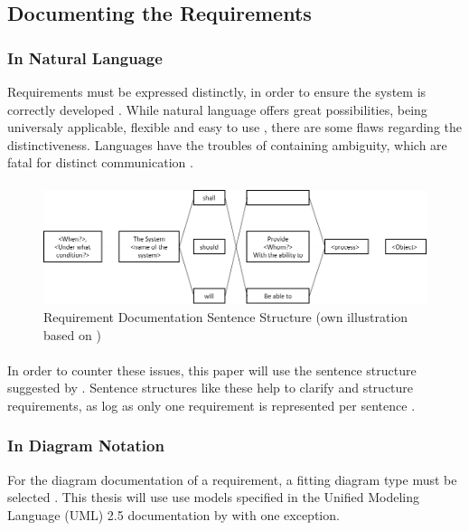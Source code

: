 \subsection{Documenting the Requirements}
\subsubsection{In Natural Language}
Requirements must be expressed distinctly, in order to ensure the system is correctly developed \parencites[107]{Ebert.2014}. While natural language offers great possibilities, being universaly applicable, flexible and easy to use \parencite[cf.][239]{Pohl.2007}, there are some flaws regarding the distinctiveness. Languages have the troubles of containing  ambiguity, which are fatal for distinct communication \parencite[cf.][239-243]{Pohl.2007}.

\paragraph{}
\begin{figure}[H]
    \centering
    \includegraphics[width=\textwidth]{img/SentenceStructure.png}
    \caption{Requirement Documentation Sentence Structure (own illustration based on \cite[246]{Pohl.2007})}
    \label{fig:sentencestructure}
\end{figure}

\paragraph{} In order to counter these issues, this paper will use the sentence structure suggested by \textcites[107]{Ebert.2014}[246]{Pohl.2007}. Sentence structures like these help to clarify and structure requirements, as log as only one requirement is represented per sentence \parencite[107]{Ebert.2014}. 


\subsubsection{In Diagram Notation}
For the diagram documentation of a requirement, a fitting diagram type must be selected \textcite[299]{Pohl.2007}.  This thesis will use use models specified in the Unified Modeling Language (UML) 2.5 documentation by \textcite{ObjectManagementGroup.01.03.2015} with one exception. 

